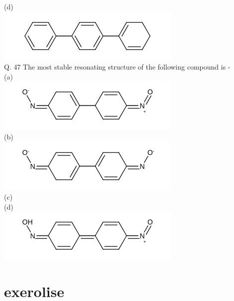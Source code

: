 \documentclass[10pt]{article}
\begin{document}
(d)\\
\includegraphics{smile-02bb3953fded5364ffc05d355e094ed2375b4f4c}\\
Q. 47 The most stable resonating structure of the following compound is -\\
(a)\\
\includegraphics{smile-7e05cb500263fd4495a29b6e32c28ee7c17ee9bf}\\
(b)\\
\includegraphics{smile-3d1b54d909649ca454e5e3ab5db2338b377b68d9}\\
(c)\\
(d)\\
\includegraphics{smile-22ea04d87dbdcd10ca94bd7e0890fc8f10be198d}

\section*{exerolise}
\end{document}
